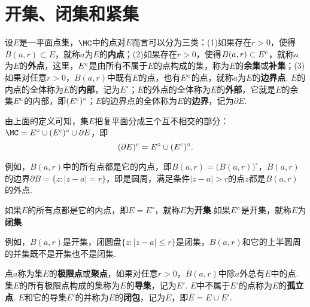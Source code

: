 \section{开集、闭集和紧集\label{sec1.5}}
设$E$是一平面点集，$\MC$中的点对$E$而言可以分为三类：(1)如果存在$r>0$，使得$B(a,r)\subset E$，就称$a$为$E$的\textbf{内点}；(2)如果存在$r>0$，使得$B(a,r)\subset E^{\textrm c}$，就称$a$为$E$的\textbf{外点}，这里，$E^{\textrm c}$是由所有不属于$E$的点构成的集，称为$E$的\textbf{余集}或\textbf{补集}；(3)如果对任意$r>
0$，$B(a,r)$中既有$E$的点，也有$E^{\textrm c}$的点，就称$a$为$E$的\textbf{边界点}. $E$的内点的全体称为$E$的\textbf{内部}，记为$E^\circ$；$E$的外点的全体称为$E$的\textbf{外部}，它就是$E$的余集$E^{\textrm c}$的内部，即$(E^{\textrm c})^\circ$；$E$的边界点的全体称为$E$的\textbf{边界}，记为$\partial E$.

由上面的定义可知，集$E$把复平面分成三个互不相交的部分：$\MC=E^\circ\cup(E^{\textrm c})^\circ\cup\partial E$，即
\begin{equation}\label{eq1.5.1}
(\partial E)^{\textrm c}=E^\circ\cup(E^{\textrm c})^\circ.
\end{equation}

例如，$B(a,r)$中的所有点都是它的内点，即$B(a,r)=\big(B(a,r)\bigr)^\circ$，$B(a,r)$的边界$\partial B=\{z:|z-a|=r\}$，即是圆周，满足条件$|z-a|>r$的点$z$都是$B(a,r)$的外点.

如果$E$的所有点都是它的内点，即$E=E^\circ$，就称$E$为\textbf{开集}.如果$E^{\textrm c}$是开集，就称$E$为\textbf{闭集}.

例如，$B(a,r)$是开集，闭圆盘$\{z:|z-a|\le r\}$是闭集，$B(a,r)$和它的上半圆周的并集既不是开集也不是闭集.

点$a$称为集$E$的\textbf{极限点}或\textbf{聚点}，如果对任意$r>0$，$B(a,r)$中除$a$外总有$E$中的点. 集$E$的所有极限点构成的集称为$E$的\textbf{导集}，记为$E'$. $E$中不属于$E'$的点称为$E$的\textbf{孤立点}. $E$和它的导集$E'$的并称为$E$的\textbf{闭包}，记为$\bar E$，即$\bar E=E\cup E'$.

